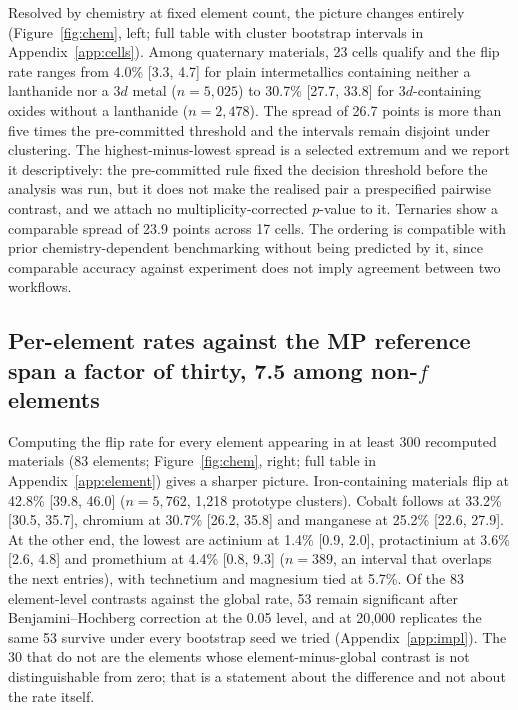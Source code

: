 \documentclass[11pt]{article}
\begin{document}
Resolved by chemistry at fixed element count, the picture changes entirely
(Figure~\ref{fig:chem}, left; full table with cluster bootstrap intervals in
Appendix~\ref{app:cells}). Among quaternary materials, 23 cells qualify and the flip rate
ranges from 4.0\% [3.3, 4.7] for plain intermetallics containing neither a lanthanide nor
a 3$d$ metal ($n=5{,}025$) to 30.7\% [27.7, 33.8] for 3$d$-containing oxides without a
lanthanide ($n=2{,}478$). The spread of 26.7 points is more than five times the
pre-committed threshold and the intervals remain disjoint under clustering. The
highest-minus-lowest spread is a selected extremum and we report it descriptively: the
pre-committed rule fixed the decision threshold before the analysis was run, but it does
not make the realised pair a prespecified pairwise contrast, and we attach no
multiplicity-corrected $p$-value to it. Ternaries show a comparable spread of 23.9 points
across 17 cells. The ordering is compatible with prior chemistry-dependent benchmarking
\citep{kothakonda2023} without being predicted by it, since comparable accuracy against
experiment does not imply agreement between two workflows.


\subsection{Per-element rates against the MP reference span a factor of thirty, 7.5 among non-\texorpdfstring{$f$}{f} elements}\label{sec:element}

Computing the flip rate for every element appearing in at least 300 recomputed materials
(83 elements; Figure~\ref{fig:chem}, right; full table in Appendix~\ref{app:element}) gives a
sharper picture. Iron-containing materials flip at 42.8\% [39.8, 46.0] ($n=5{,}762$,
1{,}218 prototype clusters). Cobalt follows at 33.2\% [30.5, 35.7], chromium at 30.7\%
[26.2, 35.8] and manganese at 25.2\% [22.6, 27.9]. At the other end, the lowest are
actinium at 1.4\% [0.9, 2.0], protactinium at 3.6\% [2.6, 4.8] and promethium at 4.4\% [0.8, 9.3]
($n=389$, an interval that overlaps the next entries), with technetium and magnesium tied at 5.7\%. Of the 83 element-level contrasts
against the global rate, 53 remain significant after Benjamini--Hochberg correction at
the 0.05 level, and at 20{,}000 replicates the same 53 survive under every bootstrap seed
we tried (Appendix~\ref{app:impl}). The 30 that do not are the elements whose
element-minus-global contrast is not distinguishable
from zero; that is a statement about the difference and not about the rate itself.
\end{document}
